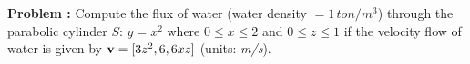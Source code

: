 {\bf Problem :} Compute the flux of water (water density $= 1 \, ton/m^3$) through the parabolic cylinder $S:\, y=x^2$ where $0 \le x \le 2$ and $0 \le z \le 1$ if the velocity flow of water is given by $\text{\bf v} = [3z^2, 6, 6xz]$ (units: {\em m/s}).
